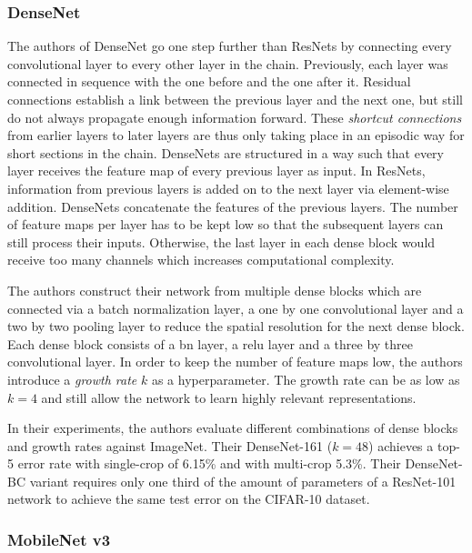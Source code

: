 \documentclass[draft,final]{vutinfth} %
\begin{document}
\subsubsection{DenseNet}
\label{sssec:theory-densenet}

The authors of DenseNet \cite{huang2017} go one step further than
ResNets by connecting every convolutional layer to every other layer
in the chain. Previously, each layer was connected in sequence with
the one before and the one after it. Residual connections establish a
link between the previous layer and the next one, but still do not
always propagate enough information forward. These \emph{shortcut
connections} from earlier layers to later layers are thus only taking
place in an episodic way for short sections in the chain. DenseNets
are structured in a way such that every layer receives the feature map
of every previous layer as input. In ResNets, information from
previous layers is added on to the next layer via element-wise
addition. DenseNets concatenate the features of the previous
layers. The number of feature maps per layer has to be kept low so
that the subsequent layers can still process their inputs. Otherwise,
the last layer in each dense block would receive too many channels
which increases computational complexity.

The authors construct their network from multiple dense blocks which
are connected via a batch normalization layer, a one by one
convolutional layer and a two by two pooling layer to reduce the
spatial resolution for the next dense block. Each dense block consists
of a \gls{bn} layer, a \gls{relu} layer and a three by three
convolutional layer. In order to keep the number of feature maps low,
the authors introduce a \emph{growth rate} $k$ as a
hyperparameter. The growth rate can be as low as $k=4$ and still allow
the network to learn highly relevant representations.

In their experiments, the authors evaluate different combinations of
dense blocks and growth rates against ImageNet. Their DenseNet-161
($k=48$) achieves a top-5 error rate with single-crop of 6.15\% and
with multi-crop 5.3\%. Their DenseNet-BC variant requires only one
third of the amount of parameters of a ResNet-101 network to achieve
the same test error on the CIFAR-10 dataset.

\subsubsection{MobileNet v3}
\label{sssec:theory-mobilenet-v3}
\end{document}
